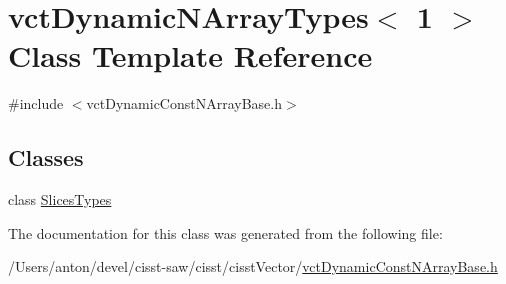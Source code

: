 \hypertarget{classvct_dynamic_n_array_types_3_011_01_4}{}\section{vct\+Dynamic\+N\+Array\+Types$<$ 1 $>$ Class Template Reference}
\label{classvct_dynamic_n_array_types_3_011_01_4}


{\ttfamily \#include $<$vct\+Dynamic\+Const\+N\+Array\+Base.\+h$>$}

\subsection*{Classes}
\begin{DoxyCompactItemize}
\item 
class \hyperlink{classvct_dynamic_n_array_types_3_011_01_4_1_1_slices_types}{Slices\+Types}
\end{DoxyCompactItemize}


The documentation for this class was generated from the following file\+:\begin{DoxyCompactItemize}
\item 
/\+Users/anton/devel/cisst-\/saw/cisst/cisst\+Vector/\hyperlink{vct_dynamic_const_n_array_base_8h}{vct\+Dynamic\+Const\+N\+Array\+Base.\+h}\end{DoxyCompactItemize}
